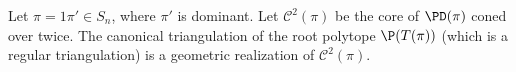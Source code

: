 \begin{theo}\label{thm:intro}
Let $\pi=1\pi' \in S_n$, where $\pi'$ is dominant. Let $\mathcal{C}^2(\pi)$ be the core of $\PD(\pi)$ coned over twice. The canonical triangulation of the root polytope $\P(T(\pi))$ (which is a regular triangulation) is a geometric realization of $\mathcal{C}^2(\pi)$.
\end{theo}
